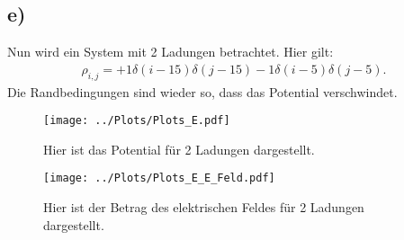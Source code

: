 \subsection*{e)}
Nun wird ein System mit 2 Ladungen  betrachtet. Hier gilt:
\begin{align}
	\rho_{i,j}=+1\delta(i-15)\delta(j-15)-1\delta(i-5)\delta(j-5).
\end{align}
Die Randbedingungen sind wieder so, dass das Potential verschwindet.
\begin{figure}[h!]
	\centering
	\texttt{[image: ../Plots/Plots\_E.pdf]}
	\caption{Hier ist das Potential für 2 Ladungen dargestellt.}
\end{figure}
\begin{figure}[h!]
	\centering
	\texttt{[image: ../Plots/Plots\_E\_E\_Feld.pdf]}
	\caption{Hier ist der Betrag des elektrischen Feldes für 2 Ladungen dargestellt.}
\end{figure}